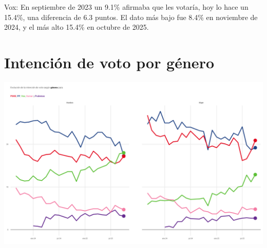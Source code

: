 \documentclass[
  letterpaper,
  DIV=11,
  numbers=noendperiod]{scrreprt}
\begin{document}
{Vox}: En septiembre de 2023 un 9.1\% afirmaba que les votaría, hoy lo
hace un 15.4\%, una diferencia de 6.3 puntos. El dato más bajo fue 8.4\%
en noviembre de 2024, y el más alto 15.4\% en octubre de 2025.

\chapter{Intención de voto por
género}\label{intenciuxf3n-de-voto-por-guxe9nero}

\includegraphics[width=8in,height=\textheight,keepaspectratio]{figures/p_idv_genero_static.png}
\end{document}
